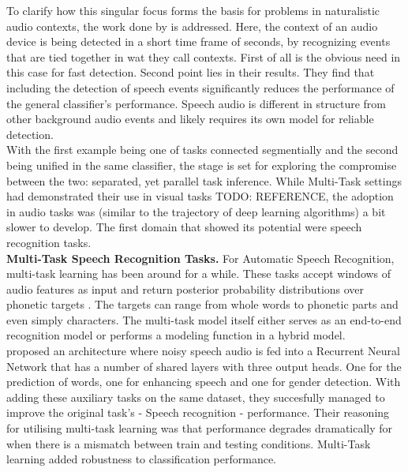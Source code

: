 To clarify how this singular focus forms the basis for problems in naturalistic audio contexts, the work done by \cite{park2020augmenting} is addressed. Here, the context of an audio device is being detected in a short time frame of seconds, by recognizing events that are tied together in wat they call contexts. First of all is the obvious need in this case for fast detection. Second point lies in their results. They find that including the detection of speech events significantly reduces the performance of the general classifier's performance. Speech audio is different in structure from other background audio events and likely requires its own model for reliable detection.\\

With the first example being one of tasks connected segmentially and the second being unified in the same classifier, the stage is set for exploring the compromise between the two: separated, yet parallel task inference. While Multi-Task settings had demonstrated their use in visual tasks TODO: REFERENCE, the adoption in audio tasks was (similar to the trajectory of deep learning algorithms) a bit slower to develop. The first domain that showed its potential were speech recognition tasks.\\


\textbf{Multi-Task Speech Recognition Tasks.} For Automatic Speech Recognition, multi-task learning has been around for a while. These tasks accept windows of audio features as input and return posterior probability distributions over phonetic targets \citep{meyer2019multi}. The targets can range from whole words to phonetic parts and even simply characters. The multi-task model itself either serves as an end-to-end recognition model or performs a modeling function in a hybrid model. \\

\cite{lu2004multitask} proposed an architecture where noisy speech audio is fed into a Recurrent Neural Network that has a number of shared layers with three output heads. One for the prediction of words, one for enhancing speech and one for gender detection. With adding these auxiliary tasks on the same dataset, they succesfully managed to improve the original task's - Speech recognition - performance. Their reasoning for utilising multi-task learning was that performance degrades dramatically for when there is a mismatch between train and testing conditions. Multi-Task learning added robustness to classification performance. \\

